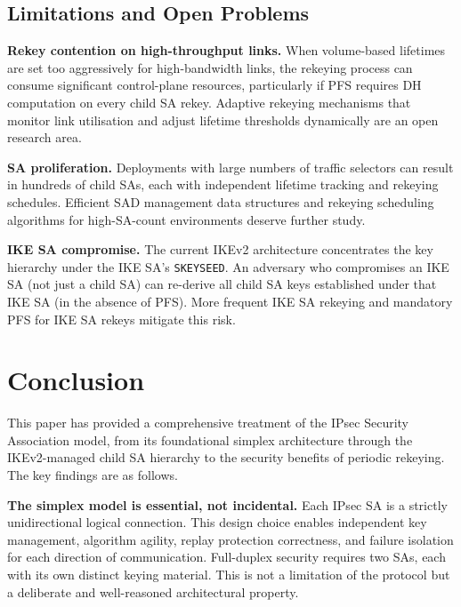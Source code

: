 \documentclass[sigconf,nonacm]{acmart}
\begin{document}
\subsection{Limitations and Open Problems}

\textbf{Rekey contention on high-throughput links.} When volume-based lifetimes are
set too aggressively for high-bandwidth links, the rekeying process can consume
significant control-plane resources, particularly if PFS requires DH computation on
every child SA rekey. Adaptive rekeying mechanisms that monitor link utilisation and
adjust lifetime thresholds dynamically are an open research area.

\textbf{SA proliferation.} Deployments with large numbers of traffic selectors can
result in hundreds of child SAs, each with independent lifetime tracking and rekeying
schedules. Efficient SAD management data structures and rekeying scheduling algorithms
for high-SA-count environments deserve further study.

\textbf{IKE SA compromise.} The current IKEv2 architecture concentrates the key
hierarchy under the IKE SA's \texttt{SKEYSEED}. An adversary who compromises an IKE
SA (not just a child SA) can re-derive all child SA keys established under that IKE SA
(in the absence of PFS). More frequent IKE SA rekeying and mandatory PFS for IKE SA
rekeys mitigate this risk.

\section{Conclusion}
\label{sec:conclusion}

This paper has provided a comprehensive treatment of the IPsec Security Association
model, from its foundational simplex architecture through the IKEv2-managed child SA
hierarchy to the security benefits of periodic rekeying. The key findings are as
follows.

\textbf{The simplex model is essential, not incidental.} Each IPsec SA is a strictly
unidirectional logical connection. This design choice enables independent key
management, algorithm agility, replay protection correctness, and failure isolation
for each direction of communication. Full-duplex security requires two SAs, each
with its own distinct keying material. This is not a limitation of the protocol but a
deliberate and well-reasoned architectural property.
\end{document}
